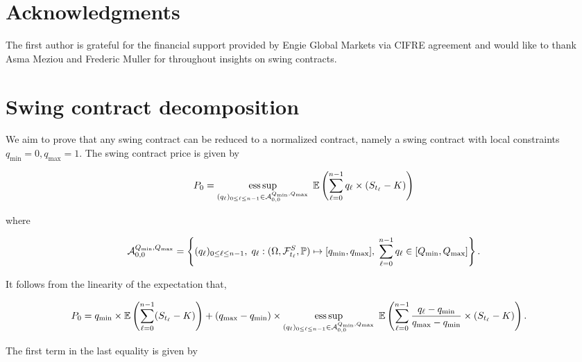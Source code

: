 \documentclass{article}
\DeclareMathOperator*{\esssup}{ess\,sup}
\numberwithin{equation}{section}
\begin{document}
\section*{Acknowledgments}

The first author is grateful for the financial support provided by Engie Global Markets via CIFRE agreement and would like to thank Asma Meziou and Frederic Muller for throughout insights on swing contracts.

\footnotesize
\appendix

\section{Swing contract decomposition}
\label{swing decompo}

\indent

We aim to prove that any swing contract can be reduced to a normalized contract, namely a swing contract with local constraints $q_{\min} = 0, q_{\max} = 1$. The swing contract price is given by

\begin{equation*}
    P_0 = \esssup_{(q_{\ell})_{0 \le \ell \le n-1} \in \mathcal{A}_{0, 0}^{Q_{\min}, Q_{\max}}} \hspace{0.1cm} \mathbb{E}\left(\sum_{\ell=0}^{n-1} q_{\ell} \times (S_{t_\ell} - K) \right)
\end{equation*}

\noindent
where 

$$\mathcal{A}_{0, 0}^{Q_{\min}, Q_{\max}} = \left\{(q_{\ell})_{0 \le \ell \le n-1}, \hspace{0.1cm} q_{\ell} : (\Omega, \mathcal{F}_{t_\ell}^S, \mathbb{P}) \mapsto [q_{\min}, q_{\max}], \hspace{0.1cm} \sum_{\ell = 0}^{n-1} q_{\ell} \in [Q_{\min}, Q_{\max}] \right\}.$$

\noindent
It follows from the linearity of the expectation that,

\begin{align*}
    P_0 &= q_{\min} \times \mathbb{E}\left(\sum_{\ell=0}^{n-1} (S_{t_\ell} - K) \right) + (q_{\max} - q_{\min}) \times \esssup_{(q_{\ell})_{0 \le \ell \le n-1} \in \mathcal{A}_{0, 0}^{Q_{\min}, Q_{\max}}} \hspace{0.1cm} \mathbb{E}\left(\sum_{\ell=0}^{n-1} \frac{q_{\ell} - q_{\min}}{q_{\max} - q_{\min}} \times (S_{t_\ell} - K) \right).
\end{align*}

\noindent
The first term in the last equality is given by
\end{document}
